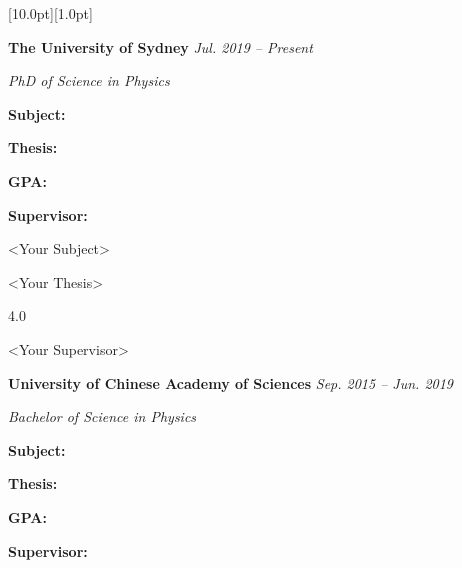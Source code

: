 \documentclass[12pt,a4paper,utf8]{report}
\begin{document}
\begin{minipage}[t]{16cm}
    \colorbox{subtitlecolor}{\raisebox{0pt}[10.0pt][1.0pt]{
        \textcolor{white}{\textsf{}}}}
\end{minipage}\par
\vspace{0.2cm}\hspace{0.5cm}
\begin{minipage}[t]{15.0cm}
    {{\textbf{The University of Sydney}}}\hfill
    {\em{Jul. 2019 -- Present}}\par\vspace{0.1cm}
    {\qquad\em{PhD of Science in Physics}}\par
\end{minipage}\par
\vspace{0.1cm}
    \begin{minipage}[t]{4cm}
        \qquad \textbf{Subject:}\par
        \qquad \textbf{Thesis:}\par
        \qquad \par
        \qquad \textbf{GPA:}\par
        \qquad \textbf{Supervisor:}\par
    \end{minipage}
    \begin{minipage}[t]{11cm}
        \textless Your Subject\textgreater \par
        \textless Your Thesis\textgreater \par
        4.0 \par
        \textless Your Supervisor\textgreater \par
    \end{minipage}\par
\vspace{0.2cm}\hspace{0.5cm}
\begin{minipage}[t]{15.0cm}
    {{\textbf{University of Chinese Academy of Sciences}}}\hfill
    {\em{Sep. 2015 -- Jun. 2019}}\par\vspace{0.1cm}
    {\qquad\em{Bachelor of Science in Physics}}\par
\end{minipage}\par
\vspace{0.1cm}
    \begin{minipage}[t]{4cm}
        \qquad \textbf{Subject:}\par
        \qquad \textbf{Thesis:}\par
        \qquad \par
        \qquad \textbf{GPA:}\par
        \qquad \textbf{Supervisor:}\par
    \end{minipage}
\end{document}
